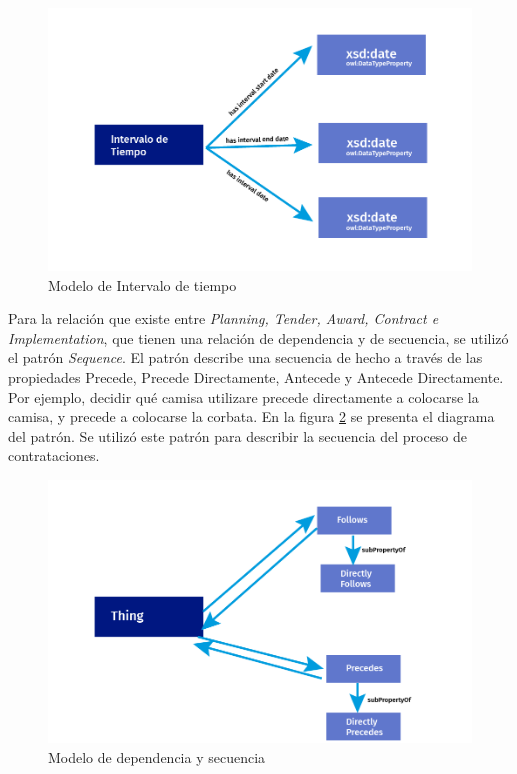 \begin{figure}[ht!]
    \centering
    \includegraphics[width=150mm]{figuras/Diagramas_Tiempo.png}
    \caption{Modelo de Intervalo de tiempo}
    \label{img:Modelo de Intervalo de precio}
    
\end{figure}

Para la relación que existe entre \textit{Planning, Tender, Award, Contract e Implementation}, que tienen una relación de dependencia y de secuencia, se utilizó el patrón \textit{Sequence}. El patrón describe una secuencia de hecho a través de las propiedades Precede, Precede Directamente, Antecede y Antecede Directamente. Por ejemplo, decidir qué camisa utilizare precede directamente a colocarse la camisa, y precede a colocarse la corbata. En la figura \ref{img:Modelo de dependencia y secuencia} se presenta el diagrama del patrón. Se utilizó este patrón para describir la secuencia del proceso de contrataciones.

\begin{figure}[ht!]
    \centering
    \includegraphics[width=150mm]{figuras/Diagramas_Follows.png}
    \caption{Modelo de dependencia y secuencia}
    \label{img:Modelo de dependencia y secuencia}
    
\end{figure}

